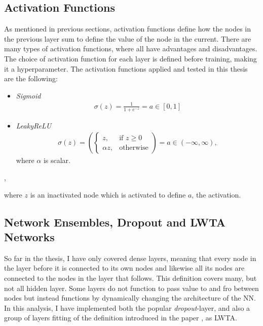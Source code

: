 \subsection{Activation Functions}\label{subsec:activation}
As mentioned in previous sections, activation functions define how the nodes in the previous layer 
sum to define the value of the node in the current. There are many types of activation functions, 
where all have advantages and disadvantages. The choice of activation function for each layer is defined
before training, making it a hyperparameter. The activation functions applied and tested in this thesis are the following:
\begin{center}
\begin{itemize}
    \item  \emph{Sigmoid}\\  
    \begin{align*}
         \sigma{(z)} = \frac{1}{1+e^{-z}} = a \in [0,1]
    \end{align*}
    \item \emph{LeakyReLU}
    \begin{align*}
        \sigma{(z)} = \left(
        \begin{cases}
            z,& \text{if } z\geq 0\\
            \alpha z,              & \text{otherwise}
        \end{cases}\right)
        = a \in (-\infty, \infty),
   \end{align*}
   where $\alpha$ is scalar.
\end{itemize},
\end{center}
where $z$ is an inactivated node which is activated to define $a$, the activation.

\subsection{Network Ensembles, Dropout and LWTA Networks}\label{subsec:LWTA}
So far in the thesis, I have only covered dense layers, meaning that every node in the layer before it is 
connected to its own nodes and likewise all its nodes are connected to the nodes in the layer that follows. 
This definition covers many, but not all hidden layer. Some layers do not function to pass value to and 
fro between nodes but instead functions by dynamically changing the architecture of the \ac{NN}. In this analysis, 
I have implemented both the popular \emph{dropout}-layer, and also a group of layers fitting of the definition 
introduced in the paper \cite{srivastava_compete_2013}, as \ac{LWTA}.
